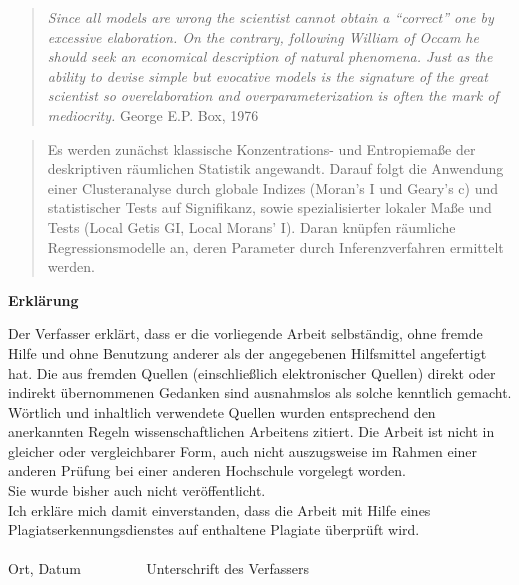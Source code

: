 


    \begin{quotation}
        \glqq […] \textit{Since all models are wrong the scientist cannot obtain a ``correct'' one by excessive elaboration. 
        On the contrary, following William of Occam he should seek an economical description of natural phenomena. 
        Just as the ability to devise simple but evocative models is the signature of the great scientist 
        so overelaboration and overparameterization is often the mark of mediocrity.}\grqq{} George E.P. Box, 1976
    \end{quotation}


\begin{abstract}

Es werden zunächst klassische Konzentrations- und Entropiemaße der deskriptiven räumlichen Statistik angewandt.
Darauf folgt die Anwendung einer Clusteranalyse durch globale Indizes (Moran’s I und Geary’s c)
und statistischer Tests auf Signifikanz, 
sowie spezialisierter lokaler Maße und Tests (Local Getis GI, Local Morans’ I). 
Daran knüpfen räumliche Regressionsmodelle an, deren Parameter durch Inferenzverfahren ermittelt werden.\\


\end{abstract}


\textbf{Erklärung}

Der Verfasser erklärt, dass er die vorliegende Arbeit selbständig, ohne fremde Hilfe und ohne Benutzung anderer 
als der angegebenen Hilfsmittel angefertigt hat. Die aus fremden Quellen (einschließlich elektronischer Quellen) 
direkt oder indirekt übernommenen Gedanken sind ausnahmslos als solche kenntlich gemacht. 
Wörtlich und inhaltlich verwendete Quellen wurden entsprechend den anerkannten Regeln wissenschaftlichen Arbeitens zitiert. 
Die Arbeit ist nicht in gleicher oder vergleichbarer Form, auch nicht  auszugsweise im Rahmen einer anderen Prüfung 
bei  einer anderen Hochschule vorgelegt worden.\\

Sie wurde bisher auch nicht veröffentlicht.\\

Ich erkläre mich damit einverstanden, dass die Arbeit mit Hilfe eines Plagiatserkennungsdienstes auf enthaltene Plagiate überprüft wird.\\
\\


Ort, Datum       $\qquad \qquad$           Unterschrift des Verfassers     